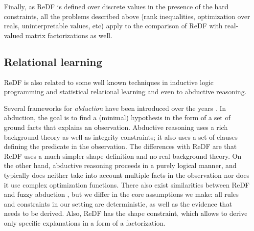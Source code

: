 Finally, as ReDF is defined over discrete values in the presence of the hard constraints, all the problems described above (rank inequalities, optimization over reals, uninterpretable values, etc) apply to the comparison of ReDF with real-valued matrix factorizations as well.\changese



\subsection{Relational learning}
ReDF is also related to some well known techniques in inductive logic programming and statistical relational learning
and even to abductive reasoning. 

Several frameworks for {\em abduction} have been introduced over the years \citep{abduction,abductioninduction}. 
In abduction, the goal is to find a (minimal) hypothesis in the form
of a set of ground facts that explains an observation. Abductive reasoning uses
a rich background theory as well as integrity constraints; it also uses
a set of clauses defining the predicate in the observation. The differences with ReDF are that 
ReDF uses a much simpler shape definition and no real background theory. On the other hand, abductive reasoning
proceeds in a purely logical manner, and typically does neither take into account multiple facts in the observation nor does it use complex optimization functions.  
There also exist similarities between ReDF and fuzzy abduction \citep{fuzzylogicabduction,fuzzystudy}, but we differ in the core assumptions we make: all rules and constraints in our setting are deterministic, as well as the evidence that needs to be derived. Also, ReDF has the shape constraint, which allows to derive only specific explanations in a form of a factorization.


